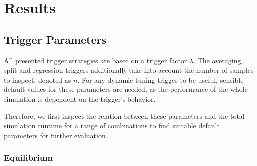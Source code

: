 \chapter[Results]{Results}
\label{cp:results}

{
	\parindent0pt
	\textellipsis
}


\section{Trigger Parameters}
All presented trigger strategies are based on a trigger factor $\lambda$. The averaging, split and regression triggers additionally take into account the number of samples to inspect, denoted as $n$. For any dynamic tuning trigger to be useful, sensible default values for these parameters are needed, as the performance of the whole simulation is dependent on the trigger's behavior.

Therefore, we first inspect the relation between these parameters and the total simulation runtime for a range of combinations to find suitable default parameters for further evaluation.




\subsection{Equilibrium}

